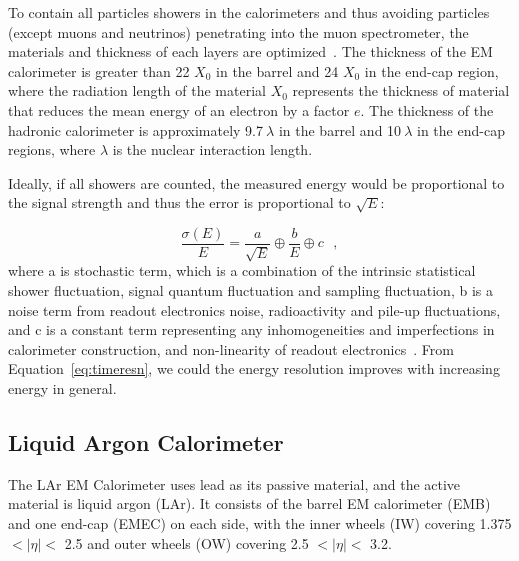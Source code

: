 \par To contain all particles showers in the calorimeters and thus avoiding particles (except muons and neutrinos) penetrating into the muon spectrometer, the materials and thickness of each layers are optimized~\cite{Aad:1129811}. The thickness of the EM calorimeter is greater than 22 $X_0$ in the barrel and 24 $X_0$ in the end-cap region, where the radiation length of the material $X_0$ represents the thickness of material that reduces the mean energy of an electron by a factor $e$. The thickness of the hadronic calorimeter is approximately 9.7$~\lambda$ in the barrel and 10$~\lambda$ in the end-cap regions, where $\lambda$ is the nuclear interaction length.

\par Ideally, if all showers are counted, the measured energy would be proportional to the signal strength and thus the error is proportional to $\sqrt{E}$:

\begin{equation}
\label{eq:timeresn}
\frac{\sigma(E)}{E} = \frac{a}{\sqrt{E}} \oplus \frac{b}{E} \oplus c \ \ \  ,
\end{equation}
where a is stochastic term, which is a combination of the intrinsic statistical shower fluctuation, signal quantum fluctuation and sampling fluctuation, b is a noise term from readout electronics noise, radioactivity and pile-up fluctuations, and c is a constant term representing any inhomogeneities and imperfections in calorimeter construction, and non-linearity of readout electronics~\cite{calorimetry}. From Equation~\ref{eq:timeresn}, we could the energy resolution improves with increasing energy in general.

\subsection{Liquid Argon Calorimeter}

\par The LAr EM Calorimeter uses lead as its passive material, and the active material is liquid argon (LAr). 
It consists of the barrel EM calorimeter (EMB) and one end-cap (EMEC) on each side, with the inner wheels (IW) covering 1.375 $< |\eta| <$ 2.5 and outer wheels (OW) covering 2.5 $< |\eta| <$ 3.2.

